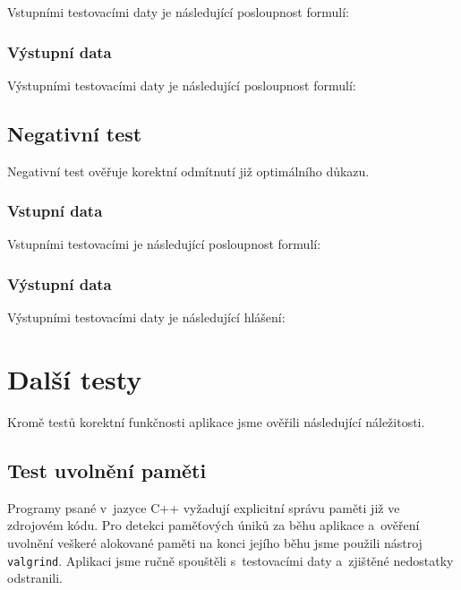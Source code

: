 \documentclass[thesis=B,czech,hidelinks]{thesis}[2012/06/26]
\begin{document}
Vstupními testovacími daty je následující posloupnost formulí:


\subsubsection{Výstupní data}

Výstupními testovacími daty je následující posloupnost formulí:


\subsection{Negativní test}

Negativní test ověřuje korektní odmítnutí již optimálního důkazu.

\subsubsection{Vstupní data}

Vstupními testovacími je následující posloupnost formulí:


\subsubsection{Výstupní data}

Výstupními testovacími daty je následující hlášení:


\section{Další testy}

Kromě testů korektní funkčnosti aplikace jsme ověřili následující náležitosti.

\subsection{Test uvolnění paměti}

Programy psané v~jazyce C++ vyžadují explicitní správu paměti již ve zdrojovém kódu. Pro detekci paměťových úniků za běhu aplikace a~ověření uvolnění veškeré alokované paměti na konci jejího běhu jsme použili nástroj \texttt{valgrind}. Aplikaci jsme ručně spouštěli s~testovacími daty a~zjištěné nedostatky odstranili.
\end{document}
